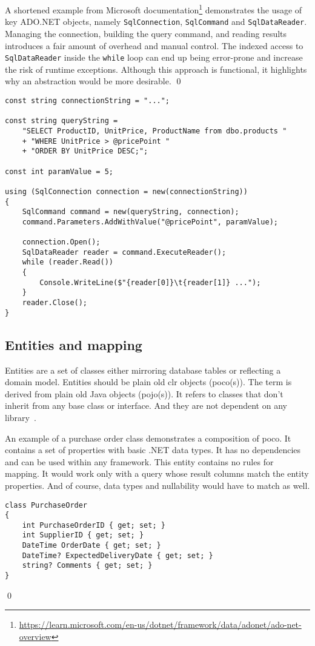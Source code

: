 \begin{example}
\small
A shortened example from Microsoft documentation\footnote{\url{https://learn.microsoft.com/en-us/dotnet/framework/data/adonet/ado-net-overview}} demonstrates the usage of key ADO.NET objects, namely \texttt{SqlConnection}, \texttt{SqlCommand} and \texttt{SqlDataReader}. Managing the connection, building the query command, and reading results introduces a fair amount of overhead and manual control. The indexed access to \texttt{SqlDataReader} inside the \texttt{while} loop can end up being error-prone and increase the risk of runtime exceptions. Although this approach is functional, it highlights why an abstraction would be more desirable.
\qed

\begin{lstlisting}[language=CSharp]
const string connectionString = "...";

const string queryString =
    "SELECT ProductID, UnitPrice, ProductName from dbo.products "
    + "WHERE UnitPrice > @pricePoint "
    + "ORDER BY UnitPrice DESC;";

const int paramValue = 5;

using (SqlConnection connection = new(connectionString))
{
    SqlCommand command = new(queryString, connection);
    command.Parameters.AddWithValue("@pricePoint", paramValue);

    connection.Open();
    SqlDataReader reader = command.ExecuteReader();
    while (reader.Read())
    {
        Console.WriteLine($"{reader[0]}\t{reader[1]} ...");
    }
    reader.Close();
}
\end{lstlisting}
\end{example}

\subsection{Entities and mapping}
Entities are a set of classes either mirroring database tables or reflecting a domain model. Entities should be plain old \acrshort{clr} objects (\acrshort{poco}(s)). The term is derived from plain old Java objects (\acrshort{pojo}(s)). It refers to classes that don't inherit from any base class or interface. And they are not dependent on any library~\cite{Fowler2003POJO}.

\begin{example}
\small
An example of a purchase order class demonstrates a composition of \acrshort{poco}. It contains a set of properties with basic .NET data types. It has no dependencies and can be used within any framework. This entity contains no rules for mapping. It would work only with a query whose result columns match the entity properties. And of course, data types and nullability would have to match as well.
\begin{lstlisting}[language=CSharp]
class PurchaseOrder
{
    int PurchaseOrderID { get; set; }
    int SupplierID { get; set; }
    DateTime OrderDate { get; set; }
    DateTime? ExpectedDeliveryDate { get; set; }
    string? Comments { get; set; }
}
\end{lstlisting}
\qed
\end{example}

